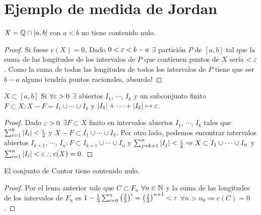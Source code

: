 \section{Ejemplo de medida de Jordan}

\begin{eg}
  \(X = \mathbb{Q} \cap [a, b]\) con \(a < b\) no tiene contenido nulo.
  \begin{proof}
    Si fuese \(c(X) = 0\), Dado \(0 < \varepsilon < b-a\) \(\exists \) partición \(P\) de \([a, b]\) tal que la suma de las longitudes de los intervalos de \(P\) que contienen puntos de \(X\) sería \(< \varepsilon \).
    Como la suma de todas las longitudes de todos los intervalos de \(P\) tiene que ser \(b-a\) alguno tendría puntos racionales, absurdo!
  \end{proof}
\end{eg}

\begin{lemma}
  \(X \subset [a, b]\) Si \(\forall \varepsilon > 0\) \(\exists \) abiertos \(I_1\), \(\cdots \), \(I_k\) y un subconjunto finito \(F \subset X : X - F = I_1 \cup \cdots \cup I_k\) y \(|I_1| + \cdots + |I_k| \mapsto \varepsilon \).
  \begin{proof}
    Dado \(\varepsilon > 0\) \(\exists F \subset X\) finito en intervalos abiertos \(I_1\), \(\cdots \), \(I_k\) tales que \(\sum_{i = 1}^k |I_i| < \frac{\varepsilon}{2} \) y \(X - F \subset I_1 \cup \cdots \cup I_k\). Por otro lado,
    podemos encontrar intervalos abiertos \(I_{k+1} \), \(\cdots \), \(I_n : F \subset I_{k+1} \cup \cdots \cup I_n\) y \(\sum_{j = k+1}^n |I_j| < \frac{\varepsilon}{2} \Rightarrow X \subset I_1 \cup \cdots \cup I_n\) y \(\sum_{i = 1}^n |I_i| < \varepsilon \therefore c(X) = 0\).
  \end{proof}
\end{lemma}

\begin{eg}
  El conjunto de Cantor tiene contenido nulo.
  \begin{proof}
    Por el lema anterior vale que \(C \subset F_n\) \(\forall n \in \mathbb{N} \) y la suma de las longitudes de los intervalos de \(F_n\) es \(1 - \frac{1}{3} \sum_{i = 0}^n {\left(\frac{2}{3}\right)}^i = {\left(\frac{2}{3}\right)}^{n+1} < \varepsilon \) \(\forall n > n_0 \Rightarrow c(C) = 0\).
  \end{proof}
\end{eg}

\clearpage

